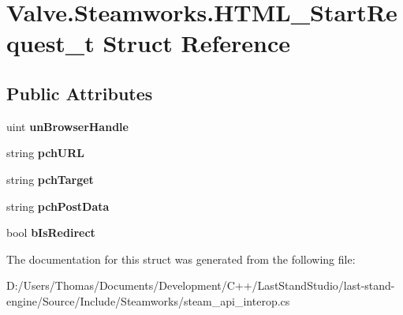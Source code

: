 \hypertarget{structValve_1_1Steamworks_1_1HTML__StartRequest__t}{}\section{Valve.\+Steamworks.\+H\+T\+M\+L\+\_\+\+Start\+Request\+\_\+t Struct Reference}
\label{structValve_1_1Steamworks_1_1HTML__StartRequest__t}
\subsection*{Public Attributes}
\begin{DoxyCompactItemize}
\item 
\hypertarget{structValve_1_1Steamworks_1_1HTML__StartRequest__t_ae65d53d74aed7bb5f65ed6f325c82653}{}uint {\bfseries un\+Browser\+Handle}\label{structValve_1_1Steamworks_1_1HTML__StartRequest__t_ae65d53d74aed7bb5f65ed6f325c82653}

\item 
\hypertarget{structValve_1_1Steamworks_1_1HTML__StartRequest__t_aeaeeb2eac8e8811caa3f6cef8403bbdc}{}string {\bfseries pch\+U\+R\+L}\label{structValve_1_1Steamworks_1_1HTML__StartRequest__t_aeaeeb2eac8e8811caa3f6cef8403bbdc}

\item 
\hypertarget{structValve_1_1Steamworks_1_1HTML__StartRequest__t_ab73bdb88032b9c5c942af50f4954183a}{}string {\bfseries pch\+Target}\label{structValve_1_1Steamworks_1_1HTML__StartRequest__t_ab73bdb88032b9c5c942af50f4954183a}

\item 
\hypertarget{structValve_1_1Steamworks_1_1HTML__StartRequest__t_a0fdb7cbf1e7e25319caedf9471313ce8}{}string {\bfseries pch\+Post\+Data}\label{structValve_1_1Steamworks_1_1HTML__StartRequest__t_a0fdb7cbf1e7e25319caedf9471313ce8}

\item 
\hypertarget{structValve_1_1Steamworks_1_1HTML__StartRequest__t_a6deb216525d7e508a323868778360597}{}bool {\bfseries b\+Is\+Redirect}\label{structValve_1_1Steamworks_1_1HTML__StartRequest__t_a6deb216525d7e508a323868778360597}

\end{DoxyCompactItemize}


The documentation for this struct was generated from the following file\+:\begin{DoxyCompactItemize}
\item 
D\+:/\+Users/\+Thomas/\+Documents/\+Development/\+C++/\+Last\+Stand\+Studio/last-\/stand-\/engine/\+Source/\+Include/\+Steamworks/steam\+\_\+api\+\_\+interop.\+cs\end{DoxyCompactItemize}

